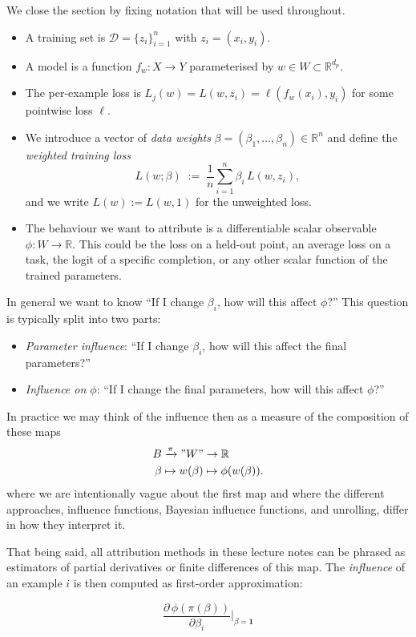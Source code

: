We close the section by fixing notation that will be used throughout.
\begin{itemize}
\item A training set is $\mathcal{D} = \{z_i\}_{i=1}^n$ with $z_i = (x_i, y_i)$.
\item A model is a function $f_w: X \to Y$ parameterised by $w \in W \subset \mathbb{R}^{d_p}$.
\item The per-example loss is $L_j(w)=L(w, z_i) = \ell(f_w(x_i), y_i)$ for some pointwise loss $\ell$. 
\item We introduce a vector of \emph{data weights} $\beta = (\beta_1, \ldots, \beta_n) \in \mathbb{R}^n$ and define the \emph{weighted training loss}
\[
  L(w; \beta) \;:=\; \frac{1}{n}\sum_{i=1}^n \beta_i\, L(w, z_i),
\]
and we write $L(w) := L(w, 1)$ for the unweighted loss.
\item The behaviour we want to attribute is a differentiable scalar observable $\phi: W \to \mathbb{R}$. This could be the loss on a held-out point, an average loss on a task, the logit of a specific completion, or any other scalar function of the trained parameters.  
\end{itemize}  

In general we want to know ``If I change $\beta_i$, how will this affect $\phi$?'' This question is typically split into two parts:
\begin{itemize}
  \item \emph{Parameter influence}: ``If I change $\beta_i$, how will this affect the final parameters?''
  \item \emph{Influence on $\phi$}: ``If I change the final parameters, how will this affect $\phi$?''
\end{itemize}
In practice we may think of the influence then as a measure of the composition of these maps
\begin{align}\label{eq:holy-maps}
  B &\xrightarrow{\pi} "W"\to \mathbb{R} \\
  \beta &\mapsto w(\beta) \mapsto \phi(w(\beta)).
\end{align}
where we are intentionally vague about the first map and where the different approaches, influence functions, Bayesian influence functions, and unrolling, differ in how they interpret it.

That being said, all attribution methods in these lecture notes can be phrased as estimators of partial derivatives or finite differences of this map. The \emph{influence} of an example $i$ is then computed as first-order approximation:

\begin{equation}\label{eq:holy-grail}
  \boxed{\;\frac{\partial\,\phi(\pi(\beta))}{\partial \beta_i}\bigg|_{\beta = \mathbf{1}}\;}
\end{equation}



